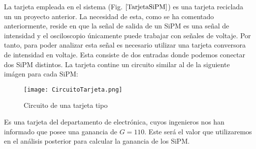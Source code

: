 La tarjeta empleada en el sistema (Fig. $\ref{TarjetaSiPM}$) es una tarjeta reciclada un un proyecto anterior. La necesidad de esta, como se ha comentado anteriormente, reside en que la señal de salida de un SiPM es una señal de intensidad y el osciloscopio únicamente puede trabajar con señales de voltaje. Por tanto, para poder analizar esta señal es necesario utilizar una tarjeta conversora de intensidad en voltaje. Esta consiste de dos entradas donde podemos conectar dos SiPM distintos. La tarjeta contine un circuito similar al de la siguiente imágen para cada SiPM:

\begin{figure}[hbtp]
\centering
\texttt{[image: CircuitoTarjeta.png]}
\caption{Circuito de una tarjeta tipo~\cite{datasheet SiPM}\label{esquemacircuitotarjeta}}
\end{figure}


Es una tarjeta del departamento de electrónica, cuyos ingenieros nos han informado que posee una ganancia de $G=110$. Este será el valor que utilizaremos en el análisis posterior para calcular la ganancia de los SiPM.

